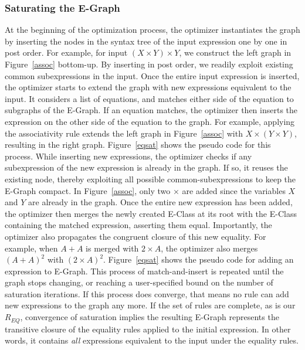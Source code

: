 \subsubsection*{Saturating the E-Graph}
At the beginning of the optimization process, the optimizer instantiates the
graph by inserting the nodes in the syntax tree of the input expression one by
one in post order. For example, for input $(X\times Y)\times Y$, we construct the left graph
in Figure~\ref{assoc} bottom-up. By inserting in post order, we readily exploit
existing common subexpressions in the input. Once the entire input expression is
inserted, the optimizer starts to extend the graph with new expressions equivalent to
the input. It considers a list of equations, and matches either side of the
equation to subgraphs of the E-Graph. If an equation matches, the optimizer then
inserts the expression on the other side of the equation to the graph. For
example, applying the associativity rule extends the left graph in
Figure~\ref{assoc} with $X\times (Y\times Y)$, resulting in the right graph.
Figure~\ref{eqsat} shows the pseudo code for this process. While inserting new
expressions, the optimizer checks if any subexpression of the new expression is
already in the graph. If so, it reuses the existing node, thereby exploiting all
possible common-subexpressions to keep the E-Graph compact. In
Figure~\ref{assoc}, only two $\times$ are added since the variables $X$ and $Y$ are
already in the graph. Once the entire new expression has been added, the
optimizer then merges the newly created E-Class at its root with the E-Class
containing the matched expression, asserting them equal. Importantly, the
optimizer also propagates the congruent closure of this new equality. For
example, when $A+A$ is merged with $2\times A$, the optimizer also merges $(A+A)^2$
with $(2\times A)^2$. Figure~\ref{eqsat} shows the pseudo code for adding an
expression to E-Graph. This process of match-and-insert is repeated until the
graph stops changing, or reaching a user-specified bound on the number of 
saturation iterations. If this process does converge, that means no rule can add new
expressions to the graph any more. If the set of rules are complete, as is our
$R_{EQ}$, convergence of saturation implies the resulting E-Graph represents
the transitive closure of the equality rules applied to the initial expression.
In other words, it contains \textit{all} expressions equivalent to the input under the equality rules.

